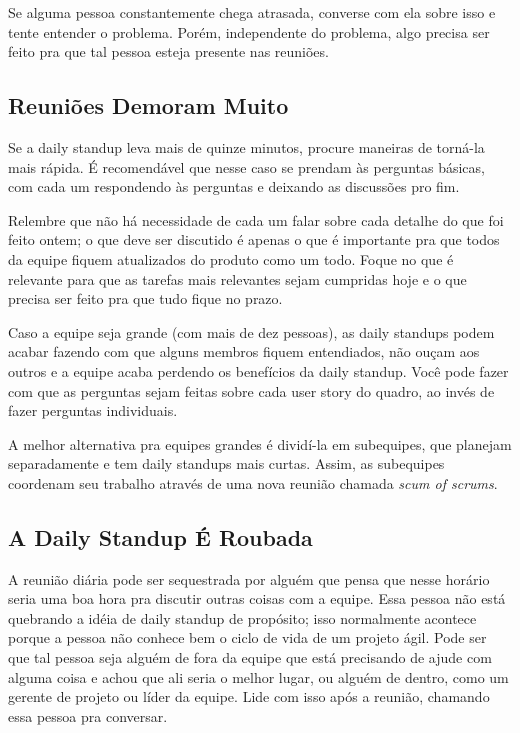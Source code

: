 \documentclass[a4paper, 10pt, font=plain]{abnt}
\begin{document}
Se alguma pessoa constantemente chega atrasada, converse com ela sobre isso e tente entender o problema. Porém, independente do problema, algo precisa ser feito pra que tal pessoa esteja presente nas reuniões.


\subsection{Reuniões Demoram Muito}
Se a daily standup leva mais de quinze minutos, procure maneiras de torná-la mais rápida. É recomendável que nesse caso se prendam às perguntas básicas, com cada um respondendo às perguntas e deixando as discussões pro fim.

Relembre que não há necessidade de cada um falar sobre cada detalhe do que foi feito ontem; o que deve ser discutido é apenas o que é importante pra que todos da equipe fiquem atualizados do produto como um todo. Foque no que é relevante para que as tarefas mais relevantes sejam cumpridas hoje e o que precisa ser feito pra que tudo fique no prazo.

Caso a equipe seja grande (com mais de dez pessoas), as daily standups podem acabar fazendo com que alguns membros fiquem entendiados, não ouçam aos outros e a equipe acaba perdendo os benefícios da daily standup. Você pode fazer com que as perguntas sejam feitas sobre cada user story do quadro, ao invés de fazer perguntas individuais.

A melhor alternativa pra equipes grandes é dividí-la em subequipes, que planejam separadamente e tem daily standups mais curtas. Assim, as subequipes coordenam seu trabalho através de uma nova reunião chamada \textit{scum of scrums}.



\subsection{A Daily Standup É Roubada}
A reunião diária pode ser sequestrada por alguém que pensa que nesse horário seria uma boa hora pra discutir outras coisas com a equipe. Essa pessoa não está quebrando a idéia de daily standup de propósito; isso normalmente acontece porque a pessoa não conhece bem o ciclo de vida de um projeto ágil. Pode ser que tal pessoa seja alguém de fora da equipe que está precisando de ajude com alguma coisa e achou que ali seria o melhor lugar, ou alguém de dentro, como um gerente de projeto ou líder da equipe. Lide com isso após a reunião, chamando essa pessoa pra conversar.
\end{document}
